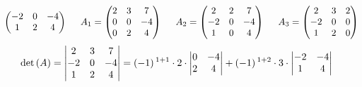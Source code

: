 \begin{enumerate}[label=\listAlph]
\[\begin{pmatrix}
                    -2 & 0 & -4 \\
                    1 & 2 & 4
                \end{pmatrix}
                \hspace{0.5cm}
                A_1 =
                \begin{pmatrix}
                    2 & 3 & 7 \\
                    0 & 0 & -4 \\
                    0 & 2 & 4
                \end{pmatrix}
                \hspace{0.5cm}
                A_2 =
                \begin{pmatrix}
                    2 & 2 & 7 \\
                    -2 & 0 & -4 \\
                    1 & 0 & 4
                \end{pmatrix}
                \hspace{0.5cm}
                A_3 =
                \begin{pmatrix}
                    2 & 3 & 2 \\
                    -2 & 0 & 0 \\
                    1 & 2 & 0
                \end{pmatrix}
            \]
            \[
                \begin{aligned}
                    \pdet{A} =
                    \begin{vmatrix}
                        2 & 3 & 7 \\
                        -2 & 0 & -4 \\
                        1 & 2 & 4
                    \end{vmatrix}
                    &=
                    \left(-1\right){}^{1 + 1}\cdot 
                    2 \cdot 
                    \begin{vmatrix}
                        0 & -4 \\
                        2 & 4 
                    \end{vmatrix}
                    + 
                    \left(-1\right){}^{1 + 2} \cdot
                    3 \cdot
                    \begin{vmatrix}
                        -2 & -4 \\
                        1 & 4
                    \end{vmatrix}

\end{aligned}\]
\end{enumerate}
